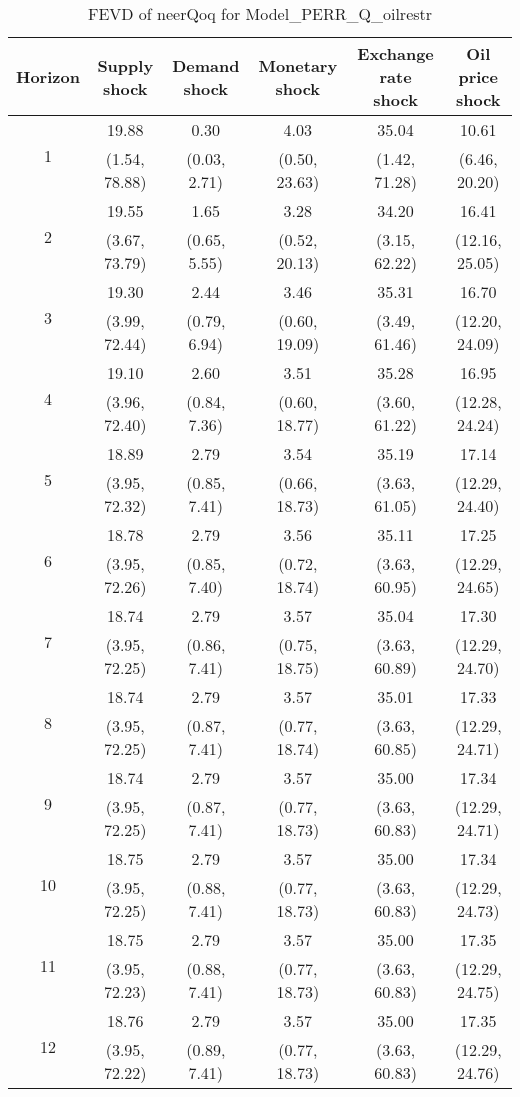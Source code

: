 \documentclass{article}
\begin{document}
\begin{table}
	\footnotesize
	\caption{FEVD of neerQoq for Model_PERR_Q_oilrestr}
	\begin{tabular}{cccccc}
		Horizon & Supply shock & Demand shock & Monetary shock & Exchange rate shock & Oil price shock\\ \hline
		\multirow{2}{*}{1} & 19.88 & 0.30 & 4.03 & 35.04 & 10.61\\
		 & (1.54, 78.88) & (0.03, 2.71) & (0.50, 23.63) & (1.42, 71.28) & (6.46, 20.20)\\
		\multirow{2}{*}{2} & 19.55 & 1.65 & 3.28 & 34.20 & 16.41\\
		 & (3.67, 73.79) & (0.65, 5.55) & (0.52, 20.13) & (3.15, 62.22) & (12.16, 25.05)\\
		\multirow{2}{*}{3} & 19.30 & 2.44 & 3.46 & 35.31 & 16.70\\
		 & (3.99, 72.44) & (0.79, 6.94) & (0.60, 19.09) & (3.49, 61.46) & (12.20, 24.09)\\
		\multirow{2}{*}{4} & 19.10 & 2.60 & 3.51 & 35.28 & 16.95\\
		 & (3.96, 72.40) & (0.84, 7.36) & (0.60, 18.77) & (3.60, 61.22) & (12.28, 24.24)\\
		\multirow{2}{*}{5} & 18.89 & 2.79 & 3.54 & 35.19 & 17.14\\
		 & (3.95, 72.32) & (0.85, 7.41) & (0.66, 18.73) & (3.63, 61.05) & (12.29, 24.40)\\
		\multirow{2}{*}{6} & 18.78 & 2.79 & 3.56 & 35.11 & 17.25\\
		 & (3.95, 72.26) & (0.85, 7.40) & (0.72, 18.74) & (3.63, 60.95) & (12.29, 24.65)\\
		\multirow{2}{*}{7} & 18.74 & 2.79 & 3.57 & 35.04 & 17.30\\
		 & (3.95, 72.25) & (0.86, 7.41) & (0.75, 18.75) & (3.63, 60.89) & (12.29, 24.70)\\
		\multirow{2}{*}{8} & 18.74 & 2.79 & 3.57 & 35.01 & 17.33\\
		 & (3.95, 72.25) & (0.87, 7.41) & (0.77, 18.74) & (3.63, 60.85) & (12.29, 24.71)\\
		\multirow{2}{*}{9} & 18.74 & 2.79 & 3.57 & 35.00 & 17.34\\
		 & (3.95, 72.25) & (0.87, 7.41) & (0.77, 18.73) & (3.63, 60.83) & (12.29, 24.71)\\
		\multirow{2}{*}{10} & 18.75 & 2.79 & 3.57 & 35.00 & 17.34\\
		 & (3.95, 72.25) & (0.88, 7.41) & (0.77, 18.73) & (3.63, 60.83) & (12.29, 24.73)\\
		\multirow{2}{*}{11} & 18.75 & 2.79 & 3.57 & 35.00 & 17.35\\
		 & (3.95, 72.23) & (0.88, 7.41) & (0.77, 18.73) & (3.63, 60.83) & (12.29, 24.75)\\
		\multirow{2}{*}{12} & 18.76 & 2.79 & 3.57 & 35.00 & 17.35\\
		 & (3.95, 72.22) & (0.89, 7.41) & (0.77, 18.73) & (3.63, 60.83) & (12.29, 24.76)\\
	\end{tabular}
\label{tab:fevd-Model_PERR_Q_oilrestr-neerQoq}
\end{table}
\end{document}
